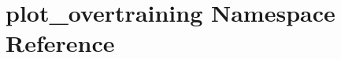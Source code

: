 \hypertarget{namespaceplot__overtraining}{
\section{plot\_\-overtraining Namespace Reference}
\label{namespaceplot__overtraining}
}
